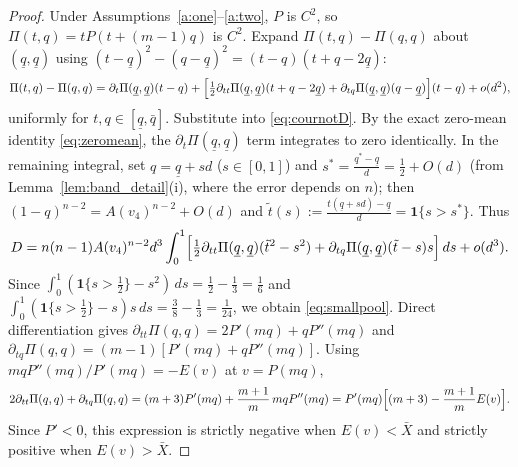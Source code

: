 \documentclass[12pt]{article}
\theoremstyle{mystyle}
\theoremstyle{mystyle2}
\newcommand{\1}{\mathbf{1}}
\begin{document}
\begin{proof}
Under Assumptions~\ref{a:one}--\ref{a:two}, $P$ is $C^2$, so $\Pi(t,q)=t P(t+(m-1)q)$ is $C^2$. Expand $\Pi(t,q)-\Pi(q,q)$ about $(\underline q,\underline q)$ using $(t-\underline q)^2-(q-\underline q)^2=(t-q)(t+q-2\underline q)$:
\[
\Pi(t,q)-\Pi(q,q) = \partial_t\Pi(\underline q,\underline q)(t-q) + \Bigl[\tfrac{1}{2}\partial_{tt}\Pi(\underline q,\underline q)(t+q-2\underline q) + \partial_{tq}\Pi(\underline q,\underline q)(q-\underline q)\Bigr](t-q) + o(d^2),
\]
uniformly for $t,q\in[\underline q,\bar q]$. Substitute into \eqref{eq:cournotD}. By the exact zero-mean identity \eqref{eq:zeromean}, the $\partial_t\Pi(\underline q,\underline q)$ term integrates to zero identically. In the remaining integral, set $q=\underline q+sd$ ($s\in[0,1]$) and $s^*=\frac{q^*-\underline q}{d}=\frac{1}{2}+O(d)$ (from Lemma~\ref{lem:band_detail}(i), where the error depends on $n$); then $(1-q)^{n-2}=A(v_4)^{n-2}+O(d)$ and $\tilde t(s):=\frac{t(\underline q+sd)-\underline q}{d}=\1\{s>s^*\}$. Thus
\[
D = n(n-1)A(v_4)^{n-2} d^3 \int_0^1 \Bigl[\tfrac{1}{2}\partial_{tt}\Pi(\underline q,\underline q)(\tilde t^2-s^2) + \partial_{tq}\Pi(\underline q,\underline q)(\tilde t-s)s\Bigr]\,ds + o(d^3).
\]
Since $\int_0^1(\1\{s>\frac{1}{2}\}-s^2)\,ds=\frac{1}{2}-\frac{1}{3}=\frac{1}{6}$ and $\int_0^1(\1\{s>\frac{1}{2}\}-s)s\,ds=\frac{3}{8}-\frac{1}{3}=\frac{1}{24}$, we obtain \eqref{eq:smallpool}. Direct differentiation gives $\partial_{tt}\Pi(q,q)=2P'(mq)+q P''(mq)$ and $\partial_{tq}\Pi(q,q)=(m-1)[P'(mq)+q P''(mq)]$. Using $mq P''(mq)/P'(mq)=-E(v)$ at $v=P(mq)$,
\[
2\partial_{tt}\Pi(q,q) + \partial_{tq}\Pi(q,q) = (m+3)P'(mq) + \frac{m+1}{m}\,mq P''(mq) = P'(mq)\Bigl[(m+3) - \frac{m+1}{m}E(v)\Bigr].
\]
Since $P'<0$, this expression is strictly negative when $E(v)<\bar X$ and strictly positive when $E(v)>\bar X$.


\end{proof}
\end{document}
